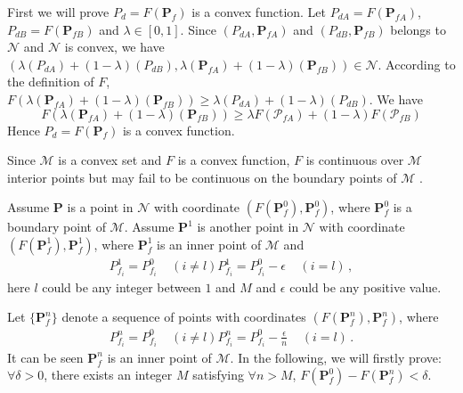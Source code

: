 \documentclass[12pt,journal,a4paper,twoside,onecolumn]{IEEEtran}
\begin{document}
\begin{spacing}{2.5}
First we will prove $P_d = F(\mathbf{P}_f)$ is a convex function. Let $P_{dA} = F(\mathbf{P}_{fA})$, $P_{dB} = F(\mathbf{P}_{fB})$ and $\lambda  \in [0, 1]$. Since $(P_{dA}, \mathbf{P}_{fA})$ and $(P_{dB}, \mathbf{P}_{fB})$ belongs to $\mathcal{N}$ and $\mathcal{N}$ is convex, we have $(\lambda(P_{dA}) + (1 - \lambda)(P_{dB}), \lambda(\mathbf{P}_{fA})+(1-\lambda)(\mathbf{P}_{fB})) \in \mathcal{N}$. According to the definition of $F$, $F(\lambda(\mathbf{P}_{fA})+(1-\lambda)(\mathbf{P}_{fB})) \geq \lambda(P_{dA}) + (1 - \lambda)(P_{dB})$. We have 
\[
F(\lambda(\mathbf{P}_{fA})+(1-\lambda)(\mathbf{P}_{fB})) \geq \lambda F(\mathcal{P}_{fA}) + (1 - \lambda)F(\mathcal{P}_{fB})
\]
Hence $P_d = F(\mathbf{P}_f)$ is a convex function.

Since $\mathcal{M}$ is a convex set and $F$ is a convex function, $F$ is continuous over $\mathcal{M}$ interior points but may fail to be continuous on the boundary points of $\mathcal{M}$ \cite{roberts1974convex}. 

Assume $\mathbf{P}$ is a point in $\mathcal{N}$ with coordinate $(F(\mathbf{P}_f^0), \mathbf{P}_f^0)$, where $\mathbf{P}_f^0$ is a boundary point of $\mathcal{M}$. Assume $\mathbf{P}^1$ is another point in $\mathcal{N}$ with coordinate $(F(\mathbf{P}_{f}^1), \mathbf{P}_{f}^1)$, where $\mathbf{P}_f^1$ is an inner point of $\mathcal{M}$ and 
\begin{equation}
\begin{split}
P_{f_i}^1 = P_{f_i}^0\;\;\;\;(i \neq l)
P_{f_i}^1 = P_{f_i}^0 - \epsilon \;\;\;\;(i =    l)\,,
\end{split}
\end{equation}
here $l$ could be any integer between $1$ and $M$ and $\epsilon$ could be any positive value. 

Let $\{\mathbf{P}_f^n\}$ denote a sequence of points with coordinates $(F(\mathbf{P}_f^n), \mathbf{P}_f^n)$, where 
\begin{equation}
\begin{split}
P_{f_i}^n = P_{f_i}^0\;\;\;\;(i \neq l)
P_{f_i}^n = P_{f_i}^0 - \frac{\epsilon}{n} \;\;\;\;(i =    l)\,.
\end{split}
\end{equation}
It can be seen $\mathbf{P}_f^n$ is an inner point of $\mathcal{M}$. In the following, we will firstly prove: $\forall \delta >0$, there exists an integer $M$ satisfying $\forall n > M$, $F(\mathbf{P}_f^0) - F(\mathbf{P}_f^n) < \delta$.


\end{spacing}
\end{document}
